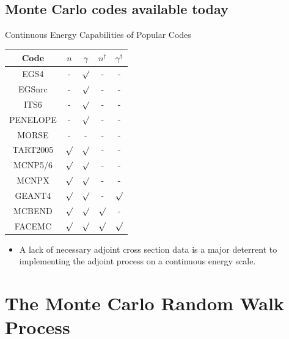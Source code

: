 \documentclass{beamer}
\begin{document}
\subsection{Monte Carlo codes available today}
\begin{frame}{Continuous Energy Capabilities of Popular Codes}
  
  \begin{table}[ht]
    \centering
    \begin{tabular}{c c c c c }
      \hline\hline
      Code & $n$ & $\gamma$ &  $n^{\dagger}$ & $\gamma^{\dagger}$ \\ [0.5ex]
      \hline
      EGS4 & - & $\surd$ & - & - \\
      EGSnrc & - & $\surd$ & - & - \\
      ITS6 & - & $\surd$ & - & - \\
      PENELOPE & - & $\surd$ & - & - \\
      MORSE & - & - & - & - \\
      TART2005 & $\surd$ & $\surd$ & - & - \\
      MCNP5/6 & $\surd$ & $\surd$ & - & - \\
      MCNPX & $\surd$ & $\surd$ & - & - \\
      GEANT4 & $\surd$ & $\surd$ & - & $\surd$ \\
      MCBEND & $\surd$ & $\surd$ & $\surd$ & - \\ [1ex]
      \hline
      FACEMC & $\surd$ & $\surd$ & $\surd$ & $\surd$ \\ [1ex]
      \hline
    \end{tabular}
  \end{table}

\begin{itemize}
  \item A lack of necessary adjoint cross section data is a major deterrent to
    implementing the adjoint process on a continuous energy scale.
\end{itemize}
  
\end{frame}

\section{The Monte Carlo Random Walk Process}
\end{document}
